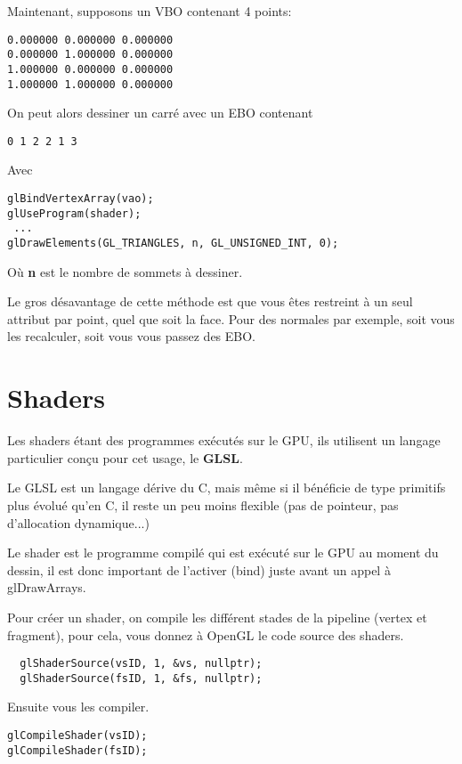 \documentclass[11pt, a4paper, titlepage]{article}
\begin{document}
Maintenant, supposons un VBO contenant 4 points:
\begin{verbatim}
0.000000 0.000000 0.000000
0.000000 1.000000 0.000000
1.000000 0.000000 0.000000
1.000000 1.000000 0.000000
\end{verbatim}

On peut alors dessiner un carré avec un EBO contenant

\begin{verbatim}
0 1 2 2 1 3
\end{verbatim}

Avec
\begin{lstlisting}
glBindVertexArray(vao);
glUseProgram(shader);
 ...
glDrawElements(GL_TRIANGLES, n, GL_UNSIGNED_INT, 0);
\end{lstlisting}

Où \textbf{n} est le nombre de sommets à dessiner.

Le gros désavantage de cette méthode est que vous êtes restreint à un
seul attribut par point, quel que soit la face. Pour des normales par
exemple, soit vous les recalculer, soit vous vous passez des EBO.

\pagebreak

\section{Shaders}

Les shaders étant des programmes exécutés sur le GPU, ils utilisent un
langage particulier conçu pour cet usage, le \textbf{GLSL}.

Le GLSL est un langage dérive du C, mais même si il bénéficie de type
primitifs plus évolué qu'en C, il reste un peu moins flexible (pas de
pointeur, pas d'allocation dynamique...)

Le shader est le programme compilé qui est exécuté sur le GPU au
moment du dessin, il est donc important de l'activer (bind) juste
avant un appel à glDrawArrays.

Pour créer un shader, on compile les différent stades de la pipeline
(vertex et fragment), pour cela, vous donnez à OpenGL le code source
des shaders.
\begin{lstlisting}
  glShaderSource(vsID, 1, &vs, nullptr);
  glShaderSource(fsID, 1, &fs, nullptr);
\end{lstlisting}

Ensuite vous les compiler.

\begin{lstlisting}
glCompileShader(vsID);
glCompileShader(fsID);
\end{lstlisting}
\end{document}
